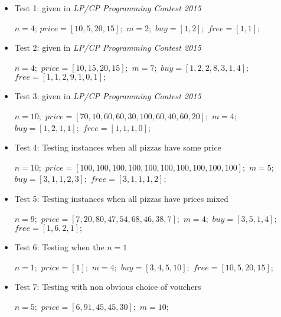 \documentclass[conference]{IEEEtran}
\begin{document}
\begin{itemize}
\item Test 1: given in \textit{LP/CP Programming Contest 2015}
\begin{algorithmic}
\State $n = 4$;
\State $price = [10,5,20,15];$
\State $m = 2;$
\State $buy = [1,2];$
\State $free = [1,1];$
\\
\end{algorithmic}
\item Test 2: given in \textit{LP/CP Programming Contest 2015}
\begin{algorithmic}
\State $n = 4;$
\State $price = [10,15,20,15];$
\State $m = 7;$
\State $buy = [1,2,2,8,3,1,4];$
\State $free = [1,1,2,9,1,0,1];$
\\
\end{algorithmic}
\item Test 3: given in \textit{LP/CP Programming Contest 2015}
\begin{algorithmic}
\State $n = 10;$
\State $price = [70,10,60,60,30,100,60,40,60,20];$
\State $m = 4;$
\State $buy = [1,2,1,1];$
\State $free = [1,1,1,0];$
\\
\end{algorithmic}
\item Test 4: Testing instances when all pizzas have same price 
\begin{algorithmic}
\State $n = 10;$
\State $price = [100,100,100,100,100,100,100,100,100,100];$
\State $m = 5;$
\State $buy = [3,1,1,2,3];$
\State $free = [3,1,1,1,2];$
\\
\end{algorithmic}
\item Test 5: Testing instances when all pizzas have prices mixed 
\begin{algorithmic}
\State $n = 9;$
\State $price = [7,20,80,47,54,68,46,38,7];$
\State $m = 4;$
\State $buy = [3,5,1,4];$
\State $free = [1,6,2,1];$
\\
\end{algorithmic}
\item Test 6: Testing when the $n = 1$
\begin{algorithmic}
\State $n = 1;$
\State $price = [1];$
\State $m = 4;$
\State $buy = [3, 4, 5, 10];$
\State $free = [10,5,20,15];$
\\
\end{algorithmic}
\item Test 7: Testing with non obvious choice of vouchers
\begin{algorithmic}
\State $n = 5;$
\State $price = [6,91,45,45,30];$
\State $m = 10;$

\end{algorithmic}
\end{itemize}
\end{document}
